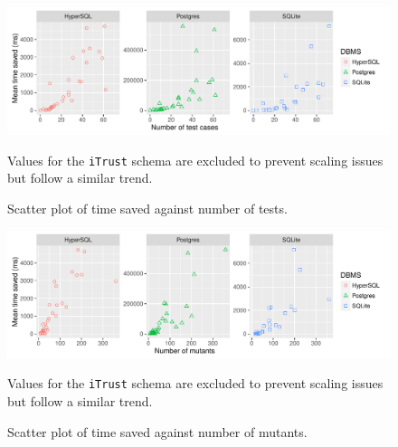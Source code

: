 
\begin{figure}[t]
  \centering
  \includegraphics[width=6in]{graphics/time_saved_vs_tests_scatter_noitrust_facetdbms.pdf}
  \caption{Scatter plot of time saved against number of tests.}
  {\small Values for the \texttt{iTrust} schema are excluded to prevent scaling issues but follow a similar trend.}
\end{figure}

\begin{figure}[t]
  \centering
  \includegraphics[width=6in]{graphics/time_saved_vs_mutants_scatter_noitrust_facetdbms.pdf}
  \caption{Scatter plot of time saved against number of mutants.}
  {\small Values for the \texttt{iTrust} schema are excluded to prevent scaling issues but follow a similar trend.}
\end{figure}


